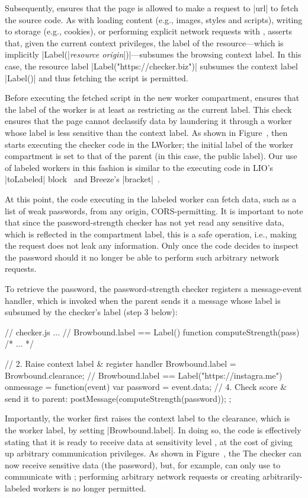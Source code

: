 Subsequently, \sys{} ensures that the page is allowed to make
a request to \js|url| to fetch the source code.
%
As with loading content (e.g., images, styles and scripts), writing to
storage (e.g., cookies), or performing explicit network requests with
\xhr{}, \sys{} asserts that, given the current context privileges, the
label of the resource---which is implicitly \js|Label(|\emph{resource
origin}\js|)|---subsumes the browsing context label.
%
In this case, the resource label \js|Label("https://checker.biz")|
subsumes the context label \js|Label()| and thus fetching the script
is permitted.

Before executing the fetched script in the new worker compartment, \sys{}
ensures that the label of the worker is at least as restricting as the
current label.
%
This check ensures that the page cannot declassify data by laundering
it through a worker whose label is less sensitive than the context
label.
%
\iffigures
\ifcompletefigures
As shown in Figure~, 
\fi
\fi
\sys{} then starts
executing the checker code in the LWorker; the initial label of the
worker compartment is set to that of the parent (in this case, the
public label).
%
Our use of labeled workers in this fashion is similar to the executing code in
LIO's \js|toLabeled| block~\cite{stefan:2011:flexible} and Breeze's
\js|bracket|~\cite{Breeze13}.
 
At this point, the code executing in the labeled worker can fetch
data, such as a list of weak passwords, from any origin,
CORS-permitting.
%
It is important to note that since the password-strength checker has
not yet read any sensitive data, which is reflected in the compartment
label, this is a safe operation, i.e., making the request does not
leak any information.
%
Only once the code decides to inspect the password should it no
longer be able to perform such arbitrary network requests.

To retrieve the password, the password-strength checker registers a
message-event handler, which is invoked when the parent sends it a
message whose label is subsumed by the checker's label (step 3 below):
\begin{jscode}
// checker.js ...
// Browbound.label == Label()
function computeStrength(pass) { /* ... */ }

// 2. Raise context label & register handler
Browbound.label = Browbound.clearance;
// Browbound.label == Label("https://instagra.me")
onmessage = function(event) {
  var password = event.data;
  // 4. Check score & send it to parent:
  postMessage(computeStrength(password));
};
\end{jscode}
%
Importantly, the worker first raises the context label to the
clearance, which is the worker label, by setting \js|Browbound.label|.
%
In doing so, the code is effectively stating that it is ready to
receive data at sensitivity level , at the cost of
giving up arbitrary communication privileges.
%
\iffigures
\ifcompletefigures
As shown in Figure~, the 
\fi
\else
The
\fi
checker can now receive
sensitive data (the password), but, for example, can only use \xhr{} to
communicate with ;
%
performing arbitrary network requests or creating arbitrarily-labeled
workers is no longer permitted.

